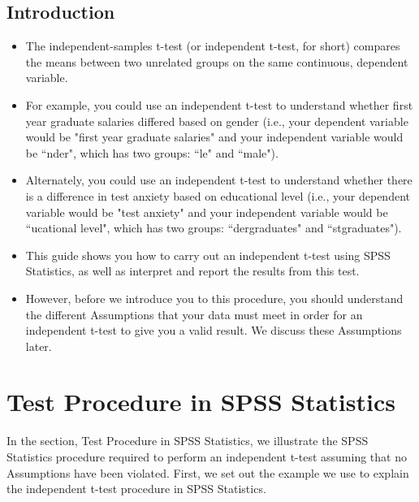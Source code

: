 \documentclass[]{article}
\begin{document}

\newpage


\subsection*{Introduction}
\begin{itemize}
\item The independent-samples t-test (or independent t-test, for short) compares the means between two unrelated groups on the same continuous, dependent variable.
\item  For example, you could use an independent t-test to understand whether first year graduate salaries differed based on gender (i.e., your dependent variable would be "first year graduate salaries" and your independent variable would be ``nder", which has two groups: ``le" and ``male"). 
\item Alternately, you could use an independent t-test to understand whether there is a difference in test anxiety based on educational level (i.e., your dependent variable would be "test anxiety" and your independent variable would be ``ucational level", which has two groups: ``dergraduates" and ``stgraduates").
	
\item This  guide shows you how to carry out an independent t-test using SPSS Statistics, as well as interpret and report the results from this test.
\item However, before we introduce you to this procedure, you should understand the different Assumptions that your data must meet in order for an independent t-test to give you a valid result. We discuss these Assumptions later.
	
\end{itemize}


\section{Test Procedure in SPSS Statistics}
	In the section, Test Procedure in SPSS Statistics, we illustrate the SPSS Statistics procedure required to perform an independent t-test assuming that no Assumptions have been violated. First, we set out the example we use to explain the independent t-test procedure in SPSS Statistics.
	
\end{document}
